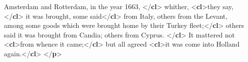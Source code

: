 \begin{shaded}
\hspace*{1em}\hspace*{1em}\hspace*{1em}\hspace*{1em} Amsterdam and Rotterdam, in the year 1663, {</\textbf{cl}>}\mbox{}\newline 
\hspace*{1em}whither, {<\textbf{cl}>}they say,{</\textbf{cl}>} it was brought,\mbox{}\newline 
\hspace*{1em}some said{</\textbf{cl}>} from Italy, others from the Levant, among some goods\mbox{}\newline 
\hspace*{1em}which were brought home by their Turkey fleet;{</\textbf{cl}>}\mbox{}\newline 
\hspace*{1em}\mbox{}\newline 
\hspace*{1em}others said it was brought from Candia;\mbox{}\newline 
\hspace*{1em}\hspace*{1em}\hspace*{1em}\hspace*{1em} others from Cyprus. {</\textbf{cl}>}\mbox{}\newline 
{}\mbox{}\newline 
{}\mbox{}\newline 
\hspace*{1em}It mattered not {<\textbf{cl}>}from whence it came;{</\textbf{cl}>}\mbox{}\newline 
\hspace*{1em}\mbox{}\newline 
\hspace*{1em}but all agreed {<\textbf{cl}>}it was come into Holland again.{</\textbf{cl}>}\mbox{}\newline 
\hspace*{1em}\mbox{}\newline 
{}\mbox{}\newline 
{</\textbf{p}>}\end{shaded}\egroup\par \par
